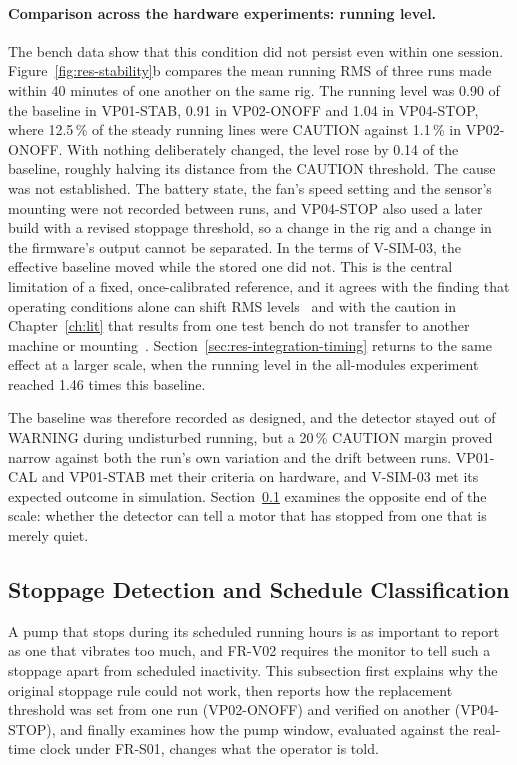 \paragraph{Comparison across the hardware experiments: running level.}
The bench data show that this condition did not persist even within one session.
Figure~\ref{fig:res-stability}b compares the mean running RMS of three runs made within 40 minutes of
one another on the same rig. The running level was 0.90 of the baseline in VP01-STAB, 0.91 in
VP02-ONOFF and 1.04 in VP04-STOP, where 12.5\,\% of the steady running lines were CAUTION against
1.1\,\% in VP02-ONOFF. With nothing deliberately changed, the level rose by 0.14 of the baseline,
roughly halving its distance from the CAUTION threshold. The cause was not established. The battery
state, the fan's speed setting and the sensor's mounting were not recorded between runs, and VP04-STOP
also used a later build with a revised stoppage threshold, so a change in the rig and a change in the
firmware's output cannot be separated. In the terms of V-SIM-03, the effective baseline moved while
the stored one did not. This is the central limitation of a fixed, once-calibrated reference, and it
agrees with the finding that operating conditions alone can shift RMS levels~\cite{meng2026} and with
the caution in Chapter~\ref{ch:lit} that results from one test bench do not transfer to another
machine or mounting~\cite{kumar2024,fidali2024}. Section~\ref{sec:res-integration-timing} returns to
the same effect at a larger scale, when the running level in the all-modules experiment reached
1.46 times this baseline.

The baseline was therefore recorded as designed, and the detector stayed out of WARNING during
undisturbed running, but a 20\,\% CAUTION margin proved narrow against both the run's own variation
and the drift between runs. VP01-CAL and VP01-STAB met their criteria on hardware, and V-SIM-03 met
its expected outcome in simulation. Section~\ref{sec:res-vib-stop} examines the opposite end of the
scale: whether the detector can tell a motor that has stopped from one that is merely quiet.

\subsection{Stoppage Detection and Schedule Classification}
\label{sec:res-vib-stop}

A pump that stops during its scheduled running hours is as important to report as one that vibrates
too much, and FR-V02 requires the monitor to tell such a stoppage apart from scheduled inactivity.
This subsection first explains why the original stoppage rule could not work, then reports how the
replacement threshold was set from one run (VP02-ONOFF) and verified on another (VP04-STOP), and
finally examines how the pump window, evaluated against the real-time clock under FR-S01, changes
what the operator is told.

